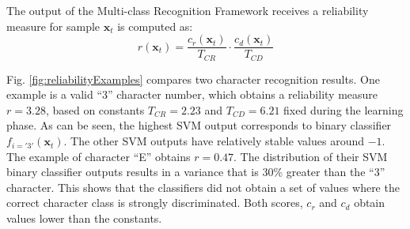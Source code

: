\documentclass{ipol}
\def\x{{\mathbf x}}
\begin{document}
The output of the Multi-class Recognition Framework receives a reliability measure for sample $\x_t$ is computed as:
\begin{equation}\label{eq:reliability}
r(\x_t) = \frac{c_r(\x_t)}{T_{CR}}\cdot \frac{c_d(\x_t)}{T_{CD}}
\end{equation}

Fig. \ref{fig:reliabilityExamples} compares two character recognition results.
One example is a valid ``3'' character number, which obtains a reliability measure $r=3.28$, based on constants $T_{CR}=2.23$ and $T_{CD}=6.21$ fixed during the learning phase.
As can be seen, the highest SVM output corresponds to binary classifier $f_{i='3'}(\x_t)$.
The other SVM outputs have relatively stable values around $-1$.
The example of character ``E'' obtains $r=0.47$.
The distribution of their SVM binary classifier outputs results in a variance that is 30\% greater than the ``3'' character.
This shows that the classifiers did not obtain a set of values where the correct character class is strongly discriminated.
Both scores, $c_r$ and $c_d$ obtain values lower than the constants.
\end{document}
